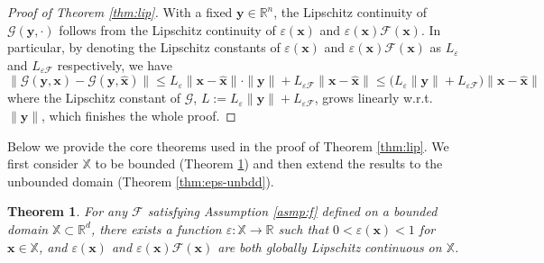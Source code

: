 \documentclass{amsart} %
\def\vx{{\bm{x}}}
\def\vy{{\bm{y}}}
\def\sR{{\mathbb{R}}}
\def\sX{{\mathbb{X}}}
\def\cF{{\mathcal{F}}}
\def\cG{{\mathcal{G}}}
\newtheorem{theorem}{Theorem}[section]
\theoremstyle{definition}
\theoremstyle{remark}
\begin{document}
\begin{proof}[Proof of Theorem \ref{thm:lip}]
    With a fixed $\vy \in \sR^n$, the Lipschitz continuity of $\cG(\vy,\cdot)$ follows from the Lipschitz continuity of $\varepsilon(\vx)$ and $\varepsilon(\vx) \cF(\vx)$. In particular, by denoting the Lipschitz constants of $\varepsilon(\vx)$ and $\varepsilon(\vx) \cF(\vx)$ as $L_{\varepsilon}$ and $L_{\varepsilon \cF}$ respectively, we have
    \[ \|\cG(\vy,\vx) - \cG(\vy, \hat{\vx})\| \leq L_{\varepsilon} \|\vx - \hat{\vx}\| \cdot \|\vy\| + L_{\varepsilon \cF} \|\vx - \hat{\vx}\| \leq \Big(L_{\varepsilon} \|\vy\| + L_{\varepsilon \cF}\Big) \|\vx - \hat{\vx}\| \]
    where the Lipschitz constant of $\cG$, $L:=L_{\varepsilon} \|\vy\| + L_{\varepsilon \cF}$, grows linearly w.r.t. $\|\vy\|$, which finishes the whole proof.
\end{proof}



Below we provide the core theorems used in the proof of Theorem \ref{thm:lip}. We first consider $\sX$ to be bounded (Theorem \ref{thm:eps}) and then extend the results to the unbounded domain (Theorem \ref{thm:eps-unbdd}).

\begin{theorem}
    \label{thm:eps}
For any $\cF$ satisfying Assumption \ref{asmp:f} defined on a bounded domain $\sX \subset \sR^d$, there exists a function $\varepsilon: \sX\to\sR$ such that $0 < \varepsilon(\vx) < 1$ for $\vx \in \sX$, and $\varepsilon(\vx)$ and $\varepsilon(\vx) \cF(\vx)$ are both globally Lipschitz continuous on $\sX$.
\end{theorem}
\end{document}

